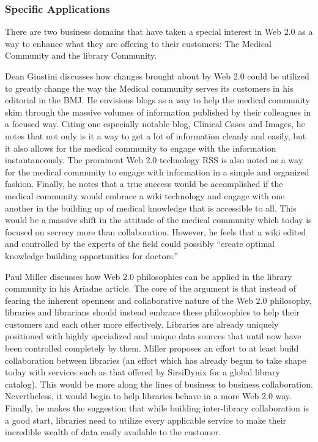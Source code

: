 \documentclass[12pt,oneside,letterpaper,titlepage]{article}
\begin{document}
\subsubsection{Specific Applications}

There are two business domains that have taken a special interest in Web 2.0 as
a way to enhance what they are offering to their customers: The Medical
Community and the library Community.

Dean Giustini \citeyearpar{giustini2006} discusses how changes brought about by
Web 2.0 could be utilized to greatly change the way the Medical community serves
its customers in his editorial in the BMJ.  He envisions blogs as a way to help
the medical community skim through the massive volumes of information published
by their colleagues in a focused way.  Citing one especially notable blog,
Clinical Cases and Images, he notes that not only is it a way to get a lot of
information cleanly and easily, but it also allows for the medical community to
engage with the information instantaneously.  The prominent Web 2.0 technology
RSS is also noted as a way for the medical community to engage with information
in a simple and organized fashion.  Finally, he notes that a true success would
be accomplished if the medical community would embrace a wiki technology and
engage with one another in the building up of medical knowledge that is
accessible to all.  This would be a massive shift in the attitude of the medical
community which today is focused on secrecy more than collaboration.  However,
he feels that a wiki edited and controlled by the experts of the field could
possibly ``create optimal knowledge building opportunities for doctors.''

Paul Miller \citeyearpar{miller2005} discusses how Web 2.0 philosophies can be
applied in the library community in his Ariadne article.  The core of the
argument is that instead of fearing the inherent openness and collaborative
nature of the Web 2.0 philosophy, libraries and librarians should instead
embrace these philosophies to help their customers and each other more
effectively.  Libraries are already uniquely positioned with highly specialized
and unique data sources that until now have been controlled completely by them.
Miller proposes an effort to at least build collaboration between libraries (an
effort which has already begun to take shape today with services such as that
offered by SirsiDynix for a global library catalog).  This would be more along
the lines of business to business collaboration.  Nevertheless, it would begin
to help libraries behave in a more Web 2.0 way.  Finally, he makes the
suggestion that while building inter-library collaboration is a good start,
libraries need to utilize every applicable service to make their incredible
wealth of data easily available to the customer.
\end{document}
